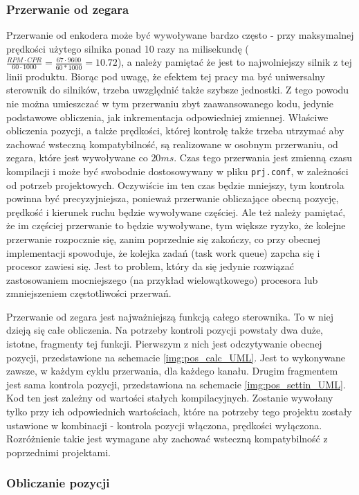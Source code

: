 \subsubsection{Przerwanie od zegara}
Przerwanie od enkodera może być wywoływane bardzo często - przy maksymalnej prędkości użytego silnika ponad 10 razy na milisekundę ($\frac{RPM \cdot CPR}{60 \cdot 1000} = \frac{67 \cdot 9600}{60 * 1000} = 10.72 $), a należy pamiętać że jest to najwolniejszy silnik z tej linii produktu. Biorąc pod uwagę, że efektem tej pracy ma być uniwersalny sterownik do silników, trzeba uwzględnić także szybsze jednostki. Z tego powodu nie można umieszczać w tym przerwaniu zbyt zaawansowanego kodu, jedynie podstawowe obliczenia, jak inkrementacja odpowiedniej zmiennej. Właściwe obliczenia pozycji, a także prędkości, której kontrolę także trzeba utrzymać aby zachować wsteczną kompatybilność, są realizowane w osobnym przerwaniu, od zegara, które jest wywoływane co $20ms$. Czas tego przerwania jest zmienną czasu kompilacji i może być swobodnie dostosowywany w pliku \texttt{prj.conf}, w zależności od potrzeb projektowych. Oczywiście im ten czas będzie mniejszy, tym kontrola powinna być precyzyjniejsza, ponieważ przerwanie obliczające obecną pozycję, prędkość i kierunek ruchu będzie wywoływane częściej. Ale też należy pamiętać, że im częściej przerwanie to będzie wywoływane, tym większe ryzyko, że kolejne przerwanie rozpocznie się, zanim poprzednie się zakończy, co przy obecnej implementacji spowoduje, że kolejka zadań (task work queue) zapcha się i procesor zawiesi się. Jest to problem, który da się jedynie rozwiązać zastosowaniem mocniejszego (na przykład wielowątkowego) procesora lub zmniejszeniem częstotliwości przerwań.

Przerwanie od zegara jest najważniejszą funkcją całego sterownika. To w niej dzieją się całe obliczenia. Na potrzeby kontroli pozycji powstały dwa duże, istotne, fragmenty tej funkcji. Pierwszym z nich jest odczytywanie obecnej pozycji, przedstawione na schemacie \ref{img:pos_calc_UML}. Jest to wykonywane zawsze, w każdym cyklu przerwania, dla każdego kanału. Drugim fragmentem jest sama kontrola pozycji, przedstawiona na schemacie \ref{img:pos_settin_UML}. Kod ten jest zależny od wartości stałych kompilacyjnych. Zostanie wywołany tylko przy ich odpowiednich wartościach, które na potrzeby tego projektu zostały ustawione w kombinacji - kontrola pozycji włączona, prędkości wyłączona. Rozróżnienie takie jest wymagane aby zachować wsteczną kompatybilność z poprzednimi projektami.

\subsubsection{Obliczanie pozycji}
\label{cha:calc_pos}

